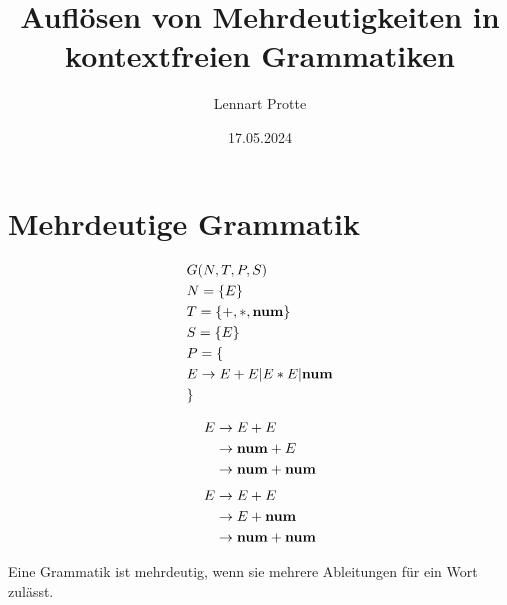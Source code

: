 \documentclass[t]{beamer}
\begin{document}

    \title{Auflösen von Mehrdeutigkeiten in kontextfreien Grammatiken}
    \date{17.05.2024}
    \author{Lennart Protte}

    \frame{\titlepage}


    \section{Mehrdeutige Grammatik}
    \begin{frame}
        \begin{minipage}[c]{0.5\textwidth}
            \centering
            \begin{align*}
                & G(N,T,P,S) \\
                & N= \{E\} \\
                & T= \{+, *, \bold{num}\} \\
                & S= \{E\}  \\
                & P = \{ \\
                & E \rightarrow E + E | E * E | \bold{num} \\
                & \}
            \end{align*}
        \end{minipage}\begin{minipage}[c]{0.5\textwidth}
                          \begin{align*}
                              & E \rightarrow E + E \\
                              & \phantom{E} \rightarrow \bold{num} + E \\
                              & \phantom{E} \rightarrow \bold{num} + \bold{num} \\
                          \end{align*}
                          \begin{align*}
                              & E \rightarrow E + E \\
                              & \phantom{E} \rightarrow E + \bold{num} \\
                              & \phantom{E} \rightarrow \bold{num} + \bold{num} \\
                          \end{align*}
        \end{minipage}
        Eine Grammatik ist mehrdeutig, wenn sie mehrere Ableitungen für ein Wort zulässt.
    \end{frame}
\end{document}
